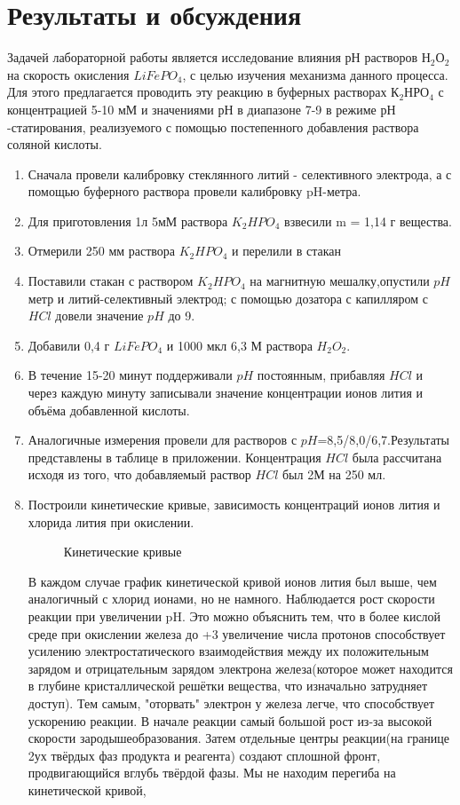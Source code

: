 \documentclass[a4paper,12pt]{article} %
\begin{document}
\section{Результаты и обсуждения}\par 

Задачей лабораторной работы является исследование влияния $рН$ растворов $Н_2О_2$ на скорость окисления $LiFePO_4$, с целью изучения механизма данного процесса. Для этого предлагается проводить эту реакцию в буферных растворах $К_2НРО_4$ с концентрацией 5-10 мМ и значениями $рН$ в диапазоне 7-9 в режиме $рН$-статирования, реализуемого с помощью постепенного добавления раствора соляной кислоты.
\begin{enumerate}
    \item Сначала провели калибровку стеклянного литий - селективного электрода, а с помощью буферного раствора провели калибровку pH-метра. 
    \item Для приготовления 1л 5мМ раствора $K_2HPO_4$ взвесили m = 1,14 г вещества.
    \item Отмерили 250 мм раствора $K_2HPO_4$ и перелили в стакан
    \item Поставили стакан с раствором $K_2HPO_4$ на магнитную мешалку,опустили $pH$ метр и литий-селективный электрод; с помощью дозатора с капилляром с $HCl$ довели значение $pH$ до 9.
    \item Добавили 0,4 г $LiFePO_4$ и 1000 мкл 6,3 М раствора $H_2O_2$.
    \item В течение 15-20 минут поддерживали $pH$ постоянным, прибавляя $HCl$ и через каждую минуту записывали значение концентрации ионов лития и объёма добавленной кислоты.
    \item Аналогичные измерения провели для растворов с $pH$=8,5/8,0/6,7.Результаты представлены в таблице в приложении. Концентрация $HCl$ была рассчитана исходя из того, что добавляемый раствор $HCl$ был 2М на 250 мл.
    \item Построили кинетические кривые, зависимость концентраций ионов лития и хлорида лития при окислении.
    \begin{figure}[H]
	\caption{\centering Кинетические кривые }
	\label{pic:5}
\end{figure}
В каждом случае график кинетической кривой ионов лития был выше, чем аналогичный с хлорид ионами, но не намного. Наблюдается рост скорости реакции при увеличении pH. Это можно объяснить тем, что в более кислой среде при окислении железа до +3 увеличение числа протонов способствует усилению электростатического взаимодействия между их положительным зарядом и отрицательным зарядом электрона железа(которое может находится в глубине кристаллической решётки вещества, что изначально затрудняет доступ). Тем самым, "оторвать" электрон у железа легче, что способствует ускорению реакции. В начале реакции самый большой рост из-за высокой скорости зародышеобразования. Затем отдельные центры реакции(на границе 2ух твёрдых фаз продукта и реагента) создают сплошной фронт, продвигающийся вглубь твёрдой фазы. Мы не находим перегиба на кинетической кривой, 

\end{enumerate}
\end{document}
